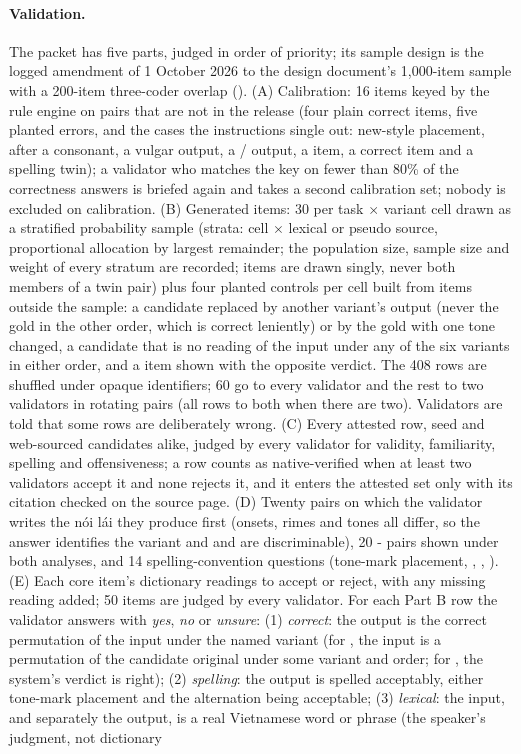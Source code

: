 \paragraph{Validation.}
The packet has five parts, judged in order of priority; its sample design is the logged amendment of 1 October 2026 to the design document's 1,000-item sample with a 200-item three-coder overlap (). (A) Calibration: 16 items keyed by the rule engine on pairs that are not in the release (four plain correct  items, five planted errors, and the cases the instructions single out: new-style placement,  after a consonant, a vulgar output, a / output, a  item, a correct  item and a  spelling twin); a validator who matches the key on fewer than 80\% of the correctness answers is briefed again and takes a second calibration set; nobody is excluded on calibration. (B) Generated items: 30 per task $\times$ variant cell drawn as a stratified probability sample (strata: cell $\times$ lexical or pseudo source, proportional allocation by largest remainder; the population size, sample size and weight of every stratum are recorded;  items are drawn singly, never both members of a twin pair) plus four planted controls per cell built from items outside the sample: a  candidate replaced by another variant's output (never the gold in the other order, which is correct leniently) or by the gold with one tone changed, a  candidate that is no reading of the input under any of the six variants in either order, and a  item shown with the opposite verdict. The 408 rows are shuffled under opaque identifiers; 60 go to every validator and the rest to two validators in rotating pairs (all rows to both when there are two). Validators are told that some rows are deliberately wrong. (C) Every attested row, seed and web-sourced candidates alike, judged by every validator for validity, familiarity, spelling and offensiveness; a row counts as native-verified when at least two validators accept it and none rejects it, and it enters the attested set only with its citation checked on the source page. (D) Twenty pairs on which the validator writes the nói lái they produce first (onsets, rimes and tones all differ, so the answer identifies the variant and  and  are discriminable), 20 - pairs shown under both analyses, and 14 spelling-convention questions (tone-mark placement, , , ). (E) Each core  item's dictionary readings to accept or reject, with any missing reading added; 50 items are judged by every validator. For each Part B row the validator answers with \emph{yes}, \emph{no} or \emph{unsure}: (1) \emph{correct}: the output is the correct permutation of the input under the named variant (for , the input is a permutation of the candidate original under some variant and order; for , the system's verdict is right); (2) \emph{spelling}: the output is spelled acceptably, either tone-mark placement and the  alternation being acceptable; (3) \emph{lexical}: the input, and separately the output, is a real Vietnamese word or phrase (the speaker's judgment, not dictionary 